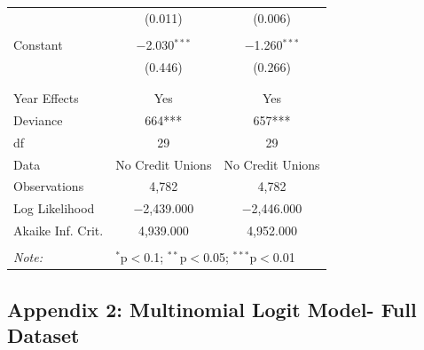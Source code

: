 \documentclass[a4paper, nobind]{templates/ociamthesis}
\begin{document}
\begin{table}[!htbp]
\begin{tabular}{@{\extracolsep{5pt}}lcc}
  & (0.011) & (0.006) \\ 
  & & \\ 
 Constant & $-$2.030$^{***}$ & $-$1.260$^{***}$ \\ 
  & (0.446) & (0.266) \\ 
  & & \\ 
\hline \\[-1.8ex] 
Year Effects & Yes & Yes \\ 
Deviance & 664*** & 657*** \\ 
df & 29 & 29 \\ 
Data & No Credit Unions & No Credit Unions \\ 
Observations & 4,782 & 4,782 \\ 
Log Likelihood & $-$2,439.000 & $-$2,446.000 \\ 
Akaike Inf. Crit. & 4,939.000 & 4,952.000 \\ 
\hline 
\hline \\[-1.8ex] 
\textit{Note:}  & \multicolumn{2}{l}{$^{*}$p$<$0.1; $^{**}$p$<$0.05; $^{***}$p$<$0.01} \\ 
\end{tabular} 
\end{table}

\newpage

\hypertarget{appendix-2-multinomial-logit-model--full-dataset}{%
\subsection{Appendix 2: Multinomial Logit Model- Full Dataset}\label{appendix-2-multinomial-logit-model--full-dataset}}
\end{document}
